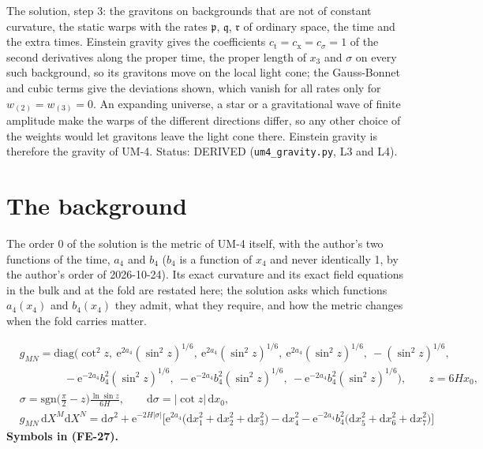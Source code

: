 \documentclass[
  10pt,
]{article}
\begin{document}
The solution, step 3: the gravitons on backgrounds that are not of
constant curvature, the static warps with the rates \(\mathfrak{p}\),
\(\mathfrak{q}\), \(\mathfrak{r}\) of ordinary space, the time and the
extra times. Einstein gravity gives the coefficients
\(c_{\mathrm{t}} = c_{\mathrm{x}} = c_\sigma = 1\) of the second
derivatives along the proper time, the proper length of \(x_3\) and
\(\sigma\) on every such background, so its gravitons move on the local
light cone; the Gauss-Bonnet and cubic terms give the deviations shown,
which vanish for all rates only for \(w_{(2)} = w_{(3)} = 0\). An
expanding universe, a star or a gravitational wave of finite amplitude
make the warps of the different directions differ, so any other choice
of the weights would let gravitons leave the light cone there. Einstein
gravity is therefore the gravity of UM-4. Status: DERIVED
(\texttt{um4\_gravity.py}, L3 and L4).

\hypertarget{the-background}{%
\section{The background}\label{the-background}}

The order 0 of the solution is the metric of UM-4 itself, with the
author's two functions of the time, \(a_4\) and \(b_4\) (\(b_4\) is a
function of \(x_4\) and never identically 1, by the author's order of
2026-10-24). Its exact curvature and its exact field equations in the
bulk and at the fold are restated here; the solution asks which
functions \(a_4(x_4)\) and \(b_4(x_4)\) they admit, what they require,
and how the metric changes when the fold carries matter.

\[
\begin{aligned}
&g_{MN} = \mathrm{diag}\Big(\cot^2z,\ \mathrm{e}^{2a_4}(\sin^2z)^{1/6},\ \mathrm{e}^{2a_4}(\sin^2z)^{1/6},
 \ \mathrm{e}^{2a_4}(\sin^2z)^{1/6},\ -(\sin^2z)^{1/6},\\
&\qquad\qquad -\mathrm{e}^{-2a_4}b_4^2(\sin^2z)^{1/6},\ -\mathrm{e}^{-2a_4}b_4^2(\sin^2z)^{1/6},
 \ -\mathrm{e}^{-2a_4}b_4^2(\sin^2z)^{1/6}\Big),\qquad z = 6Hx_0,\\
&\sigma = \mathrm{sgn}\Big(\frac{\pi}{2} - z\Big)\frac{\ln\sin z}{6H},\qquad \mathrm{d}\sigma = \lvert\cot z\rvert\,\mathrm{d}x_0,\\
&g_{MN}\,\mathrm{d}X^M\mathrm{d}X^N = \mathrm{d}\sigma^2 + \mathrm{e}^{-2H\lvert\sigma\rvert}\Big[\mathrm{e}^{2a_4}\big(\mathrm{d}x_1^2
 + \mathrm{d}x_2^2 + \mathrm{d}x_3^2\big) - \mathrm{d}x_4^2 - \mathrm{e}^{-2a_4}b_4^2\big(\mathrm{d}x_5^2 + \mathrm{d}x_6^2 + \mathrm{d}x_7^2\big)\Big]
\end{aligned} \tag{FE-27}
\] \textbf{Symbols in (FE-27).}
\end{document}

